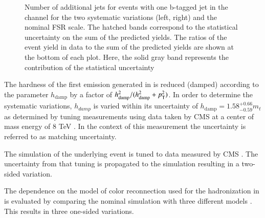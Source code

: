 \begin{figure}[htbp!]
\begin{center}
\caption{Number of additional jets for events with one b-tagged jet in the \emu channel for the two systematic variations (left, right) and the nominal FSR scale.
The hatched bands correspond to the statistical uncertainty on the sum of the predicted yields. 
        The ratios of the event yield in data to the sum of the predicted yields are
        shown at the bottom of each plot. Here, the solid gray band
        represents the contribution of the statistical uncertainty
  \label{fig:control_var_TT_FSRSCALE}}
  \end{center}
\end{figure}


The hardness of the first emission generated in \POWHEG is reduced (damped) according to the parameter $h_{\mathrm{damp}}$ by a factor of $h_{\mathrm{damp}}^2 / (h_{\mathrm{damp}}^2 + p_{\mathrm{T}}^2)$.
In order to determine the systematic variations, $h_{damp}$ is varied within its uncertainty of $h_{\mathrm{damp}} = 1.58^{+0.66}_{-0.59} m_t$
as determined by tuning measurements using data taken by CMS at a center of mass energy of 8 TeV \cite{CMS-PAS-TOP-16-021}.
In the context of this measurement the uncertainty is referred to as matching uncertainty.

The simulation of the underlying event is tuned to data measured by CMS \cite{CMS-PAS-TOP-16-021}. The uncertainty from that tuning is propagated to the simulation resulting in a two-sided variation.

The dependence on the model of color reconnection used for the hadronization in \PYTHIA is evaluated by comparing the nominal simulation with three different models \cite{Argyropoulos:2014zoa,Christiansen:2015yqa}. This results in three one-sided variations.

